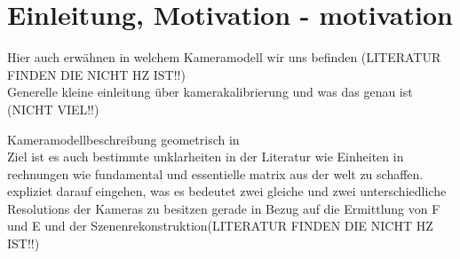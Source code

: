 \chapter{Einleitung, Motivation - motivation}

Hier auch erwähnen in welchem Kameramodell wir uns befinden (LITERATUR FINDEN DIE NICHT HZ IST!!)\\
Generelle kleine einleitung über kamerakalibrierung und was das genau ist (NICHT VIEL!!)

Kameramodellbeschreibung geometrisch in \cite{Jianzhong}\\

Ziel ist es auch bestimmte unklarheiten in der Literatur wie Einheiten in rechnungen wie fundamental und essentielle matrix aus der welt zu schaffen.\\

expliziet darauf eingehen, was es bedeutet zwei gleiche und zwei unterschiedliche Resolutions der Kameras zu besitzen gerade in Bezug auf die Ermittlung von F und E und der Szenenrekonstruktion(LITERATUR FINDEN DIE NICHT HZ IST!!)

